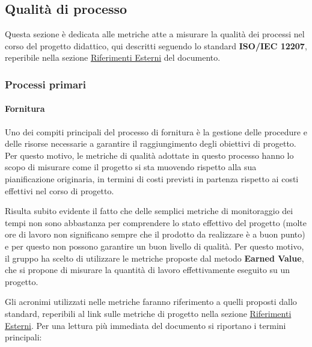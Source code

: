 \subsection{Qualità di processo}\label{sec:qualita_di_processo}
Questa sezione è dedicata alle metriche atte a misurare la qualità dei processi nel corso del progetto didattico, qui descritti seguendo lo standard \textbf{ISO/IEC 12207}, reperibile nella sezione \hyperref[sec:riferimenti_esterni]{Riferimenti Esterni} del documento. 
\subsubsection{Processi primari}
\paragraph{Fornitura}
Uno dei compiti principali del processo di fornitura è la gestione delle procedure e delle risorse necessarie a garantire il raggiungimento degli obiettivi di progetto. Per questo motivo, le metriche di qualità adottate in questo processo hanno lo scopo di misurare come il progetto si sta muovendo rispetto alla sua pianificazione originaria, in termini di costi previsti in partenza rispetto ai costi effettivi nel corso di progetto.
\par Risulta subito evidente il fatto che delle semplici metriche di monitoraggio dei tempi non sono abbastanza per comprendere lo stato effettivo del progetto (molte ore di lavoro non significano sempre che il prodotto da realizzare è a buon punto) e per questo non possono garantire un buon livello di qualità. Per questo motivo, il gruppo ha scelto di utilizzare le metriche proposte dal metodo \textbf{Earned Value}, che si propone di misurare la quantità di lavoro effettivamente eseguito su un progetto.
\par Gli acronimi utilizzati nelle metriche faranno riferimento a quelli proposti dallo standard, reperibili al link sulle metriche di progetto nella sezione \hyperref[sec:riferimenti_esterni]{Riferimenti Esterni}. Per una lettura più immediata del documento si riportano i termini principali:
